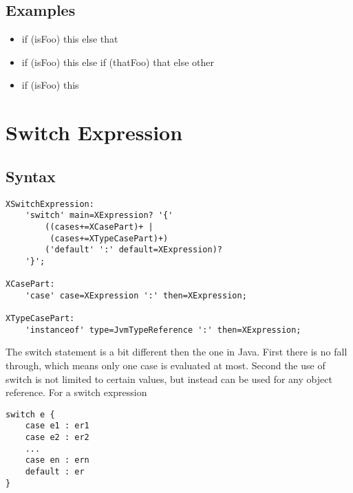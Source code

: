 \documentclass[a4paper,10pt]{scrreprt}
\newlength{\itemindentlen}
\begin{document}
\subsection{Examples}


\setlength{\itemindentlen}{\textwidth}
\begin{itemize}
\addtolength{\itemindentlen}{-2em}

\item \begin{minipage}[t]{\itemindentlen}
if (isFoo) this else that
\end{minipage}

\item \begin{minipage}[t]{\itemindentlen}
if (isFoo) this else if (thatFoo) that else other
\end{minipage}

\item \begin{minipage}[t]{\itemindentlen}
if (isFoo) this
\end{minipage}

\end{itemize}
\addtolength{\itemindentlen}{2em}







\section{Switch Expression}
\label{SwitchExpression}


\subsection{Syntax}

\begin{lstlisting}
XSwitchExpression:
	'switch' main=XExpression? '{'
		((cases+=XCasePart)+ |
		 (cases+=XTypeCasePart)+)
		('default' ':' default=XExpression)?
	'}';

XCasePart:
	'case' case=XExpression ':' then=XExpression;	

XTypeCasePart:
	'instanceof' type=JvmTypeReference ':' then=XExpression;	

\end{lstlisting}


The switch statement is a bit different then the one in Java. First there is no fall through, which means only one case is evaluated at most.
Second the use of switch is not limited to certain values, but instead can be used for any object reference. 
For a switch expression 
\begin{lstlisting}
switch e {
	case e1 : er1
	case e2 : er2
	...
	case en : ern
	default : er
}

\end{lstlisting}
\end{document}
